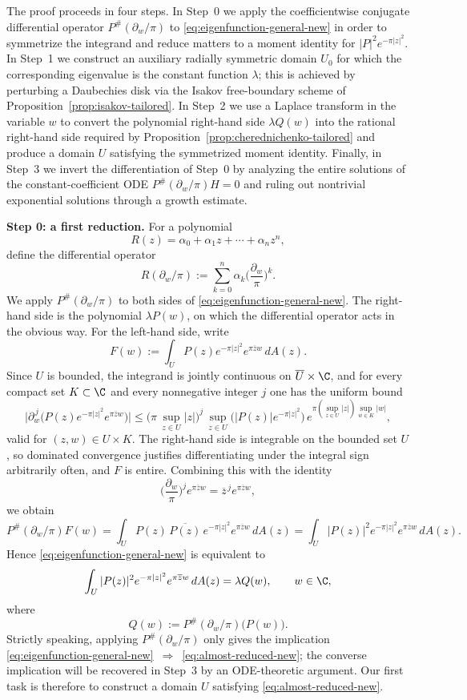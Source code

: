 \iffalse
The proof proceeds in four steps. In Step~0 we apply the coefficientwise conjugate differential operator $P^\#(\partial_w/\pi)$ to \eqref{eq:eigenfunction-general-new} in order to symmetrize the integrand and reduce matters to a moment identity for $|P|^2 e^{-\pi|z|^2}$. In Step~1 we construct an auxiliary radially symmetric domain $U_0$ for which the corresponding eigenvalue is the constant function $\lambda$; this is achieved by perturbing a Daubechies disk via the Isakov free-boundary scheme of Proposition~\ref{prop:isakov-tailored}. In Step~2 we use a Laplace transform in the variable $w$ to convert the polynomial right-hand side $\lambda Q(w)$ into the rational right-hand side required by Proposition~\ref{prop:cherednichenko-tailored} and produce a domain $U$ satisfying the symmetrized moment identity. Finally, in Step~3 we invert the differentiation of Step~0 by analyzing the entire solutions of the constant-coefficient ODE $P^\#(\partial_w/\pi)H=0$ and ruling out nontrivial exponential solutions through a growth estimate.

\medskip
\noindent\textbf{Step 0: a first reduction.}
For a polynomial
\[
R(z)=\alpha_0+\alpha_1 z+\cdots+\alpha_n z^n,
\]
define the differential operator
\[
R(\partial_w/\pi):=\sum_{k=0}^n \alpha_k\Big(\frac{\partial_w}{\pi}\Big)^k.
\]
We apply $P^\#(\partial_w/\pi)$ to both sides of \eqref{eq:eigenfunction-general-new}. The right-hand side is the polynomial $\lambda P(w)$, on which the differential operator acts in the obvious way. For the left-hand side, write
\[
F(w):=\int_U P(z)e^{-\pi|z|^2}e^{\pi \overline z w}\,dA(z).
\]
Since $U$ is bounded, the integrand is jointly continuous on $\overline U\times \C$, and for every compact set $K\subset\C$ and every nonnegative integer $j$ one has the uniform bound
\[
\big|\partial_w^{\,j}\big(P(z)e^{-\pi|z|^2}e^{\pi\overline z w}\big)\big|
\le
\big(\pi\,\sup_{z\in U}|z|\big)^{j}\,\sup_{z\in U}\!\big(|P(z)|e^{-\pi|z|^2}\big)\,e^{\pi(\sup_{z\in U}|z|)\sup_{w\in K}|w|},
\]
valid for $(z,w)\in U\times K$. The right-hand side is integrable on the bounded set $U$, so dominated convergence justifies differentiating under the integral sign arbitrarily often, and $F$ is entire. Combining this with the identity
\[
\Big(\frac{\partial_w}{\pi}\Big)^j e^{\pi \overline z w}=\overline z^{\,j} e^{\pi \overline z w},
\]
we obtain
\[
P^\#(\partial_w/\pi)F(w)
=
\int_U P(z)\,\overline{P(z)}\,e^{-\pi|z|^2}e^{\pi\overline z w}\,dA(z)
=
\int_U |P(z)|^2 e^{-\pi|z|^2}e^{\pi\overline z w}\,dA(z).
\]
Hence \eqref{eq:eigenfunction-general-new} is equivalent to
\begin{equation}\label{eq:almost-reduced-new}
\int_U |P(z)|^2 e^{-\pi|z|^2} e^{\pi \overline z w}\,dA(z)=\lambda Q(w),
\qquad w\in\C,
\end{equation}
where
\[
Q(w):=P^\#(\partial_w/\pi)\big(P(w)\big).
\]
Strictly speaking, applying $P^\#(\partial_w/\pi)$ only gives the implication \eqref{eq:eigenfunction-general-new}~$\Rightarrow$~\eqref{eq:almost-reduced-new}; the converse implication will be recovered in Step~3 by an ODE-theoretic argument. Our first task is therefore to construct a domain $U$ satisfying \eqref{eq:almost-reduced-new}.

